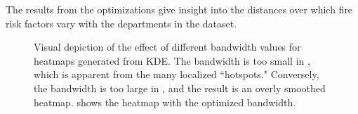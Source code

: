 \documentclass{svjour3}
\begin{document}
The results from the optimizations give insight into the distances over which fire risk factors vary with the departments in the dataset. 

\begin{figure}[!htb]
       \begin{center}
      \end{center}
      \caption{ Visual depiction of the effect of different bandwidth values for heatmaps generated from KDE. The bandwidth is too small in \protect{}, which is apparent from the many localized ``hotspots."  Conversely, the bandwidth is too large in \protect{}, and the result is an overly smoothed heatmap. \protect{} shows the heatmap with the optimized bandwidth.}
     \label{fig:band_comparison}
  \end{figure}
















\clearpage


\end{document}
